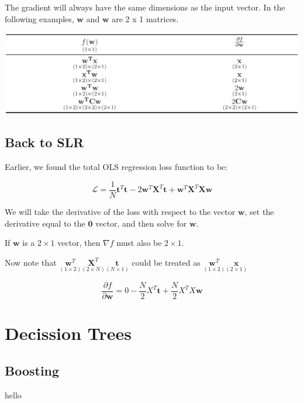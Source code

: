 \documentclass[
]{book}
\begin{document}
The gradient will always have the same dimensions as the input vector.
In the following examples, \(\mathbf{w}\) and \(\mathbf{w}\) are 2 x 1
matrices.

\includegraphics[width=18.24in]{images/derivatives}

\hypertarget{back-to-slr}{%
\section{Back to SLR}\label{back-to-slr}}

Earlier, we found the total OLS regression loss function to be:

\[\mathcal{L} = \frac{1}{N}\mathbf{t}^T\mathbf{t} - 2\mathbf{w}^T\mathbf{X}^T\mathbf{t} +
\mathbf{w}^T\mathbf{X}^T\mathbf{X}\mathbf{w}\]

We will take the derivative of the loss with respect to the vector \(\mathbf{w}\), set the derivative equal to
the \(\mathbf{0}\) vector, and then solve for \(\mathbf{w}\).

If \(\mathbf{w}\) is a \(2 \times 1\) vector, then \(\nabla{f}\) must also be \(2 \times 1\).

Now note that \(\underset{(1 \times 2)}{\mathbf{w}^T}\underset{(2 \times N)}{\mathbf{X}^T}\underset{(N \times 1)}{\mathbf{t}}\) could be treated as \(\underset{(1 \times 2)}{\mathbf{w}^T}\underset{(2 \times 1)}{\mathbf{x}}\)

\[
\frac{\partial f}{\partial\mathbf{w}} =
0 - 
\frac{N}{2}X^T\mathbf{t} +
\frac{N}{2}X^TX\mathbf{w}
\]

\hypertarget{decission-trees}{%
\chapter{Decission Trees}\label{decission-trees}}

\hypertarget{boosting}{%
\section{Boosting}\label{boosting}}

hello

  
\end{document}
